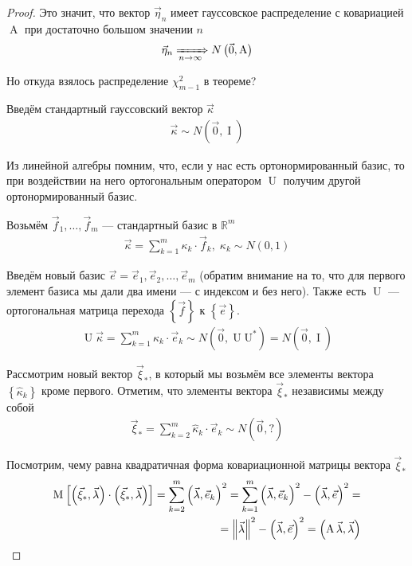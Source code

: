 \begin{proof}
  Это значит, что вектор $\vec{\eta}_n$ имеет гауссовское распределение с
  ковариацией $\operatorname{A}$ при достаточно большом значении $n$
  \begin{align*}
      \vec{\eta}_n \xRightarrow[n\to\infty]{} N\left( \vec{0}, \operatorname{A} \right)
  \end{align*}

  Но откуда взялось распределение $\chi_{m-1}^2$ в теореме?

  Введём стандартный гауссовский вектор $\vec{\kappa}$
  \begin{align*}
      \vec{\kappa} \sim N\left( \vec{0}, \operatorname{I} \right)
  \end{align*}

  Из линейной алгебры помним, что, если у нас есть ортонормированный базис,
  то при воздействии на него ортогональным оператором $\operatorname{U}$
  получим другой ортонормированный базис.

  Возьмём $\vec{f}_1, \dots, \vec{f}_m$ --- стандартный базис в
  $\mathbb{R}^m$
  \begin{align*}
      \vec{\kappa} = \sum_{k=1}^{m} \kappa_k \cdot \vec{f}_k,\;
      \kappa_k \sim N\left( 0, 1 \right)
  \end{align*}

  Введём новый базис $\vec{e} = \vec{e}_1, \vec{e}_2, \dots, \vec{e}_m$
  (обратим внимание на то, что для первого элемент базиса мы дали два имени
  --- с индексом и без него). Также есть $\operatorname{U}$ --- ортогональная
  матрица перехода $\left\{ \vec{f} \right\}$ к $\left\{ \vec{e} \right\}$.
  \begin{align*}
      \operatorname{U} \vec{\kappa}
      = \sum_{k=1}^{m} \hat{\kappa}_k \cdot \vec{e}_k
      \sim N\left( \vec{0}, \operatorname{U} \operatorname{U^*} \right)
      = N\left( \vec{0}, \operatorname{I} \right)
  \end{align*}

  Рассмотрим новый вектор $\vec{\xi}_*$, в который мы возьмём все элементы
  вектора $\left\{ \hat{\kappa}_k \right\}$ кроме первого. Отметим, что
  элементы вектора $\vec{\xi}_*$ независимы между собой
  \begin{align*}
      \vec{\xi}_* = \sum_{k=2}^{m} \hat{\kappa}_k \cdot \vec{e}_k
      \sim N\left( \vec{0}, ? \right)
  \end{align*}

  Посмотрим, чему равна квадратичная форма ковариационной матрицы вектора
  $\vec{\xi}_*$
  \begin{align*}
      \operatorname{M}_{} \left[ \left( \vec{\xi}_*, \vec{\lambda} \right) \cdot
      \left( \vec{\xi}_*, \vec{\lambda} \right) \right]
      = \sum_{k=2}^{m}\left( \vec{\lambda}, \vec{e}_k \right)^2
      = \sum_{k=1}^{m}\left( \vec{\lambda}, \vec{e}_k \right)^2
      - \left( \vec{\lambda}, \vec{e} \right)^2 = \\
      = \left\| \vec{\lambda} \right\|^2
      - \left( \vec{\lambda}, \vec{e} \right)^2
      = \left( \operatorname{A} \vec{\lambda}, \vec{\lambda} \right)
  \end{align*}


\end{proof}
